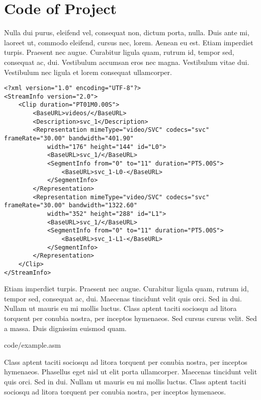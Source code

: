 
\chapter{Code of Project}
\label{chapter:appendixA}

Nulla dui purus, eleifend vel, consequat non, dictum porta, nulla. Duis ante mi, laoreet ut, commodo eleifend, cursus nec, lorem. Aenean eu est. Etiam imperdiet turpis. Praesent nec augue. Curabitur ligula quam, rutrum id, tempor sed, consequat ac, dui. Vestibulum accumsan eros nec magna. Vestibulum vitae dui. Vestibulum nec ligula et lorem consequat ullamcorper. 

\begin{lstlisting}[frame=lines,style=XML,caption={Example of a XML file.},label=xmlEx]
<?xml version="1.0" encoding="UTF-8"?>
<StreamInfo version="2.0">
    <Clip duration="PT01M0.00S">
        <BaseURL>videos/</BaseURL>
        <Description>svc_1</Description>
        <Representation mimeType="video/SVC" codecs="svc" frameRate="30.00" bandwidth="401.90"
            width="176" height="144" id="L0">
            <BaseURL>svc_1/</BaseURL>
            <SegmentInfo from="0" to="11" duration="PT5.00S">
                <BaseURL>svc_1-L0-</BaseURL>
            </SegmentInfo>
        </Representation>
        <Representation mimeType="video/SVC" codecs="svc" frameRate="30.00" bandwidth="1322.60"
            width="352" height="288" id="L1">
            <BaseURL>svc_1/</BaseURL>
            <SegmentInfo from="0" to="11" duration="PT5.00S">
                <BaseURL>svc_1-L1-</BaseURL>
            </SegmentInfo>
        </Representation>
    </Clip>
</StreamInfo>
\end{lstlisting}

Etiam imperdiet turpis. Praesent nec augue. Curabitur ligula quam, rutrum id, tempor sed, consequat ac, dui. Maecenas tincidunt velit quis orci. Sed in dui. Nullam ut mauris eu mi mollis luctus. Class aptent taciti sociosqu ad litora torquent per conubia nostra, per inceptos hymenaeos. Sed cursus cursus velit. Sed a massa. Duis dignissim euismod quam.

\begin{spacing}{0.5}

{code/example.asm}
\end{spacing}


Class aptent taciti sociosqu ad litora torquent per conubia nostra, per inceptos hymenaeos. Phasellus eget nisl ut elit porta ullamcorper. Maecenas tincidunt velit quis orci. Sed in dui. Nullam ut mauris eu mi mollis luctus. Class aptent taciti sociosqu ad litora torquent per conubia nostra, per inceptos hymenaeos.

